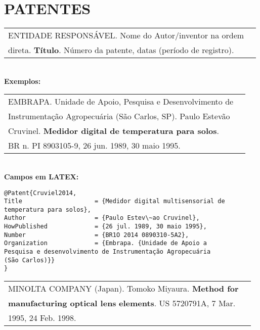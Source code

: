 \section{PATENTES}
	
\begin{tabular}{|l|c|} \hline
	ENTIDADE RESPONSÁVEL. Nome do Autor/inventor na ordem \\direta. \textbf{Título}. Número da patente, datas (período de registro).
	                                                       \\\hline
\end{tabular} \\
	
\textbf{Exemplos:} \\
	
\begin{tabular}{|l|c|} \hline
	EMBRAPA. Unidade de Apoio, Pesquisa e Desenvolvimento de 
	                                                         \\Instrumentação Agropecuária (São Carlos, SP). Paulo Estevão \\Cruvinel. \textbf{Medidor digital de temperatura para solos}. \\BR n. PI 8903105-9, 26 jun. 1989, 30 maio 1995. 
	                                                         \\\hline
\end{tabular} \\
	
\textbf{Campos em LATEX:} 
	
\begingroup
\fontsize{10pt}{12pt}\selectfont
\begin{verbatim}
@Patent{Cruviel2014,
Title                    = {Medidor digital multisensorial de 
temperatura para solos},
Author                   = {Paulo Estev\~ao Cruvinel},
HowPublished             = {26 jul. 1989, 30 maio 1995},
Number                   = {BR1O 2014 0890310-5A2},
Organization             = {Embrapa. {Unidade de Apoio a 
Pesquisa e desenvolvimento de Instrumentação Agropecuária 
(São Carlos)}}
}
\end{verbatim}
\endgroup
	
\begin{tabular}{|l|c|} \hline
	MINOLTA COMPANY (Japan). Tomoko Miyaura. \textbf{Method for} \\ \textbf{manufacturing optical lens} \textbf{elements}. US 5720791A, 7 Mar. \\1995, 24
	Feb. 1998.                                                   
	                                                             \\\hline
\end{tabular} \\
	
